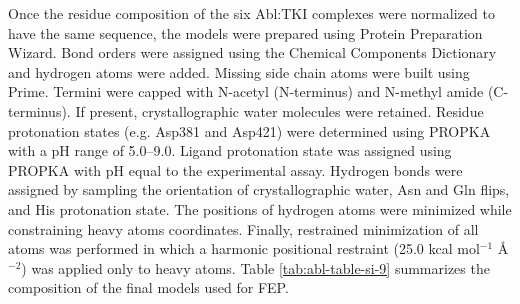 \documentclass[phd,tocprelim]{cornell}
\begin{document}
Once the residue composition of the six Abl:TKI complexes were normalized to have the same sequence, the models were prepared using Protein Preparation Wizard. Bond orders were assigned using the Chemical Components Dictionary and hydrogen atoms were added. Missing side chain atoms were built using Prime. Termini were capped with N-acetyl (N-terminus) and N-methyl amide (C-terminus). If present, crystallographic water molecules were retained. Residue protonation states (e.g. Asp381 and Asp421) were determined using PROPKA \citep{Li:ProteinsStruct.Funct.Bioinforma.:2005} with a pH range of 5.0--9.0.
Ligand protonation state was assigned using PROPKA with pH equal to the experimental assay.
Hydrogen bonds were assigned by sampling the orientation of crystallographic water, Asn and Gln flips, and His protonation state.
The positions of hydrogen atoms were minimized while constraining heavy atoms coordinates. 
Finally, restrained minimization of all atoms was performed in which a harmonic positional restraint (25.0 kcal mol$^{-1}$ {\AA}$^{-2}$) was applied only to heavy atoms. Table \ref{tab:abl-table-si-9} summarizes the composition of the final models used for FEP.
\end{document}
